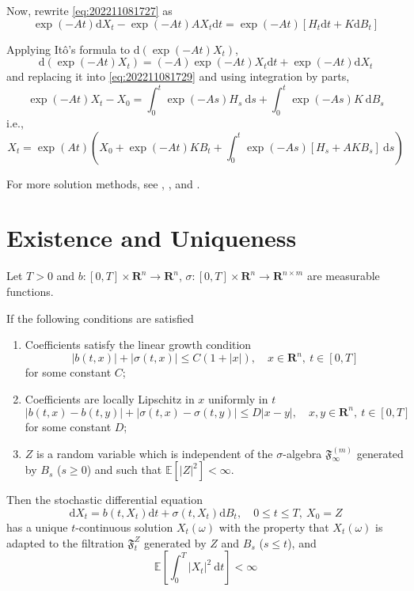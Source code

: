 \begin{example}
    Now, rewrite \eqref{eq:202211081727} as
    \begin{equation}\label{eq:202211081729}
        \exp(-At) \mathrm{d} X_t - \exp(-At) AX_t\mathrm{d}t = \exp(-At)[H_t\mathrm{d}t + K\mathrm{d}B_t]
    \end{equation}

    Applying Itô's formula to $\mathrm{d}(\exp(-At) X_t)$, 
    \[
        \mathrm{d}(\exp(-At)X_t) = (-A)\exp(-At)X_t\mathrm{d}t + \exp(-At)\mathrm{d}X_t
    \]
    and replacing it into \eqref{eq:202211081729} and using integration by parts,
    \[
        \exp(-At)X_t - X_0 = \int_0^t \exp(-As)H_s ~\mathrm{d}s + \int_0^t \exp(-As) K ~\mathrm{d}B_s
    \]
    i.e.,
    \[
        X_t = \exp(At)\left( X_0 + \exp(-At)K B_t + \int_0^t \exp(-As)[H_s + AK B_s]~\mathrm{d}s \right)
    \]
\end{example}

For more solution methods, see \cite{evans2012introduction}, \cite{gard1988introduction}, and \cite{klebaner2012introduction}.

\section{Existence and Uniqueness}

\begin{theorem}\label{thm:existence_uniqueness}
    Let $T > 0$ and $b : [0,T] \times \textbf{R}^n \longrightarrow \textbf{R}^n$, $\sigma : [0,T] \times \textbf{R}^n \longrightarrow \textbf{R}^{n \times m}$ are measurable functions.

    If the following conditions are satisfied
    \begin{enumerate}
        \item Coefficients satisfy the linear growth condition \[ |b(t,x)| + |\sigma(t,x)| \leq C(1 + |x|), \quad x \in \textbf{R}^n, ~t \in [0,T] \] for some constant $C$;
        \item Coefficients are locally Lipschitz in $x$ uniformly in $t$
        \[
            |b(t,x) - b(t,y)| + |\sigma(t,x) - \sigma(t,y)| \leq D|x-y|, \quad x,y \in \textbf{R}^n, ~t \in [0,T]
        \]
        for some constant $D$;
        \item $Z$ is a random variable which is independent of the $\sigma$-algebra $\mathfrak{F}_\infty^{(m)}$ generated by $B_s$ ($s \geq 0$) and such that $\mathbb{E}[|Z|^2] < \infty$.
    \end{enumerate}
    
    Then the stochastic differential equation 
    \begin{equation}
      \mathrm{d}X_t = b(t, X_t)\mathrm{d}t + \sigma(t, X_t) \mathrm{d}B_t, \quad 0 \leq t \leq T, ~X_0 = Z
      \label{eq:oks_5.2.3}
    \end{equation}
    has a unique $t$-continuous solution $X_t(\omega)$ with the property that $X_t(\omega)$ is adapted to the filtration $\mathfrak{F}_t^Z$ generated by $Z$ and $B_s$ ($s \leq t$), and 
    \[
        \mathbb{E}\left[ \int_0^T |X_t|^2~\mathrm{d}t \right] < \infty
    \]
\end{theorem}

